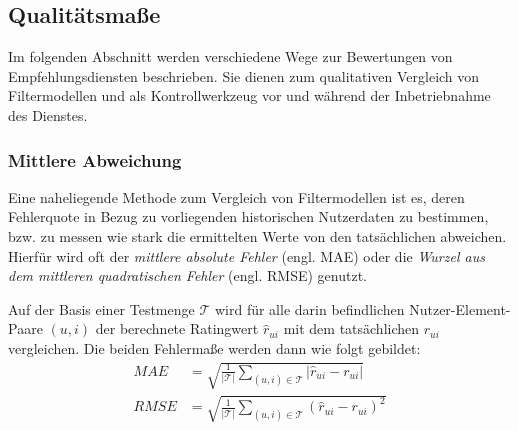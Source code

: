\subsection{Qualitätsmaße}\label{sec:measures}
%
%

Im folgenden Abschnitt werden verschiedene Wege zur Bewertungen von Empfehlungsdiensten beschrieben. Sie dienen zum qualitativen Vergleich von Filtermodellen und als Kontrollwerkzeug vor und während der Inbetriebnahme des Dienstes.

\subsubsection{Mittlere Abweichung}

Eine naheliegende Methode zum Vergleich von Filtermodellen ist es, deren Fehlerquote in Bezug zu vorliegenden historischen Nutzerdaten zu bestimmen, bzw. zu messen wie stark die ermittelten Werte von den tatsächlichen abweichen. Hierfür wird oft der \textit{mittlere absolute Fehler} (engl. \acf{MAE}) oder die \textit{Wurzel aus dem mittleren quadratischen Fehler} (engl. \acf{RMSE}) genutzt.

Auf der Basis einer Testmenge $\mathcal{T}$ wird für alle darin befindlichen Nutzer-Element-Paare $(u,i)$ der berechnete Ratingwert $\hat{r}_{ui}$ mit dem tatsächlichen $r_{ui}$ vergleichen. Die beiden Fehlermaße werden dann wie folgt gebildet:
\begin{align}
MAE & = \sqrt{\frac{1}{|\mathcal{T}|} \sum_{(u,i) \in \mathcal{T}}{|\hat{r}_{ui}-r_{ui}|}} \label{form:mae} \\
RMSE & = \sqrt{\frac{1}{|\mathcal{T}|} \sum_{(u,i) \in \mathcal{T}}{(\hat{r}_{ui}-r_{ui})^2}} \label{form:rmse}
\end{align}

